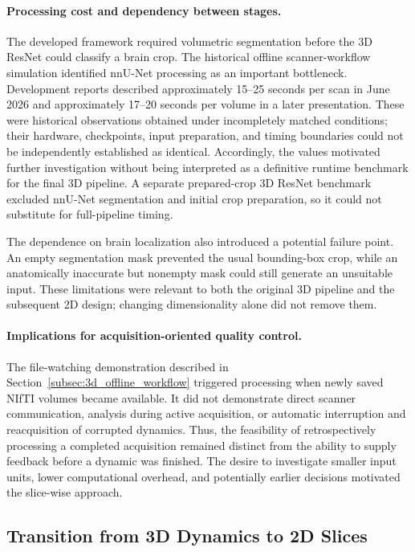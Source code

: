 \paragraph{Processing cost and dependency between stages.}
The developed framework required volumetric segmentation before the 3D ResNet could classify a brain crop. The historical offline scanner-workflow simulation identified nnU-Net processing as an important bottleneck. Development reports described approximately 15--25 seconds per scan in June 2026 and approximately 17--20 seconds per volume in a later presentation. These were historical observations obtained under incompletely matched conditions; their hardware, checkpoints, input preparation, and timing boundaries could not be independently established as identical. Accordingly, the values motivated further investigation without being interpreted as a definitive runtime benchmark for the final 3D pipeline. A separate prepared-crop 3D ResNet benchmark excluded nnU-Net segmentation and initial crop preparation, so it could not substitute for full-pipeline timing.

The dependence on brain localization also introduced a potential failure point. An empty segmentation mask prevented the usual bounding-box crop, while an anatomically inaccurate but nonempty mask could still generate an unsuitable input. These limitations were relevant to both the original 3D pipeline and the subsequent 2D design; changing dimensionality alone did not remove them.

\paragraph{Implications for acquisition-oriented quality control.}
The file-watching demonstration described in Section~\ref{subsec:3d_offline_workflow} triggered processing when newly saved NIfTI volumes became available. It did not demonstrate direct scanner communication, analysis during active acquisition, or automatic interruption and reacquisition of corrupted dynamics. Thus, the feasibility of retrospectively processing a completed acquisition remained distinct from the ability to supply feedback before a dynamic was finished. The desire to investigate smaller input units, lower computational overhead, and potentially earlier decisions motivated the slice-wise approach.

\subsection{Transition from 3D Dynamics to 2D Slices}
\label{subsec:transition_3d_to_2d}

